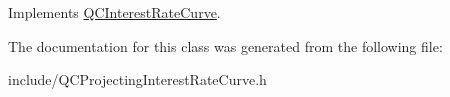 Implements \hyperlink{class_q_c_interest_rate_curve_a0a73e8506d0706becd93b04c4499a9c6}{Q\+C\+Interest\+Rate\+Curve}.



The documentation for this class was generated from the following file\+:\begin{DoxyCompactItemize}
\item 
include/Q\+C\+Projecting\+Interest\+Rate\+Curve.\+h\end{DoxyCompactItemize}
